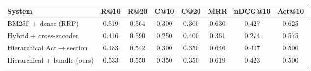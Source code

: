 \begin{tabular}{lccccccc}
\toprule
System & R@10 & R@20 & C@10 & C@20 & MRR & nDCG@10 & Act@10 \\
\midrule
BM25F + dense (RRF) & 0.519 & 0.564 & 0.300 & 0.300 & 0.630 & 0.427 & 0.625 \\
Hybrid + cross-encoder & 0.416 & 0.590 & 0.250 & 0.400 & 0.361 & 0.274 & 0.575 \\
Hierarchical Act$\rightarrow$section & 0.483 & 0.542 & 0.300 & 0.350 & 0.646 & 0.407 & 0.500 \\
Hierarchical + bundle (ours) & 0.533 & 0.550 & 0.350 & 0.350 & 0.619 & 0.423 & 0.500 \\
\bottomrule
\end{tabular}
